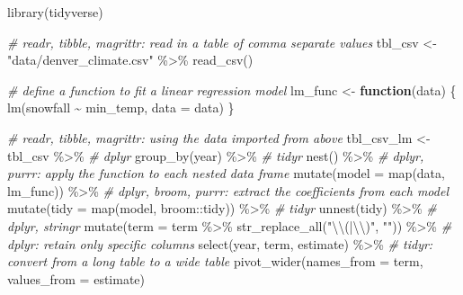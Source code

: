 \documentclass[
]{book}
\newenvironment{Shaded}{\begin{snugshade}}{\end{snugshade}}
\newcommand{\AttributeTok}[1]{\textcolor[rgb]{0.77,0.63,0.00}{#1}}
\newcommand{\CommentTok}[1]{\textcolor[rgb]{0.56,0.35,0.01}{\textit{#1}}}
\newcommand{\ControlFlowTok}[1]{\textcolor[rgb]{0.13,0.29,0.53}{\textbf{#1}}}
\newcommand{\FunctionTok}[1]{\textcolor[rgb]{0.00,0.00,0.00}{#1}}
\newcommand{\NormalTok}[1]{#1}
\newcommand{\OtherTok}[1]{\textcolor[rgb]{0.56,0.35,0.01}{#1}}
\newcommand{\SpecialCharTok}[1]{\textcolor[rgb]{0.00,0.00,0.00}{#1}}
\newcommand{\StringTok}[1]{\textcolor[rgb]{0.31,0.60,0.02}{#1}}
\begin{document}
\begin{Shaded}
\begin{Highlighting}[]
\FunctionTok{library}\NormalTok{(tidyverse)}

\CommentTok{\# readr, tibble, magrittr: read in a table of comma separate values}
\NormalTok{tbl\_csv }\OtherTok{\textless{}{-}} \StringTok{"data/denver\_climate.csv"} \SpecialCharTok{\%\textgreater{}\%} \FunctionTok{read\_csv}\NormalTok{()}

\CommentTok{\# define a function to fit a linear regression model}
\NormalTok{lm\_func }\OtherTok{\textless{}{-}} \ControlFlowTok{function}\NormalTok{(data) \{}
  \FunctionTok{lm}\NormalTok{(snowfall }\SpecialCharTok{\textasciitilde{}}\NormalTok{ min\_temp, }\AttributeTok{data =}\NormalTok{ data)}
\NormalTok{\}}

\CommentTok{\# readr, tibble, magrittr: using the data imported from above}
\NormalTok{tbl\_csv\_lm }\OtherTok{\textless{}{-}}\NormalTok{ tbl\_csv }\SpecialCharTok{\%\textgreater{}\%}
  \CommentTok{\# dplyr}
  \FunctionTok{group\_by}\NormalTok{(year) }\SpecialCharTok{\%\textgreater{}\%}
  \CommentTok{\# tidyr}
  \FunctionTok{nest}\NormalTok{() }\SpecialCharTok{\%\textgreater{}\%}
  \CommentTok{\# dplyr, purrr: apply the function to each nested data frame}
  \FunctionTok{mutate}\NormalTok{(}\AttributeTok{model =} \FunctionTok{map}\NormalTok{(data, lm\_func)) }\SpecialCharTok{\%\textgreater{}\%}
  \CommentTok{\# dplyr, broom, purrr: extract the coefficients from each model}
  \FunctionTok{mutate}\NormalTok{(}\AttributeTok{tidy =} \FunctionTok{map}\NormalTok{(model, broom}\SpecialCharTok{::}\NormalTok{tidy)) }\SpecialCharTok{\%\textgreater{}\%}
  \CommentTok{\# tidyr}
  \FunctionTok{unnest}\NormalTok{(tidy) }\SpecialCharTok{\%\textgreater{}\%}
  \CommentTok{\# dplyr, stringr}
  \FunctionTok{mutate}\NormalTok{(}\AttributeTok{term =}\NormalTok{ term }\SpecialCharTok{\%\textgreater{}\%} \FunctionTok{str\_replace\_all}\NormalTok{(}\StringTok{"}\SpecialCharTok{\textbackslash{}\textbackslash{}}\StringTok{(|}\SpecialCharTok{\textbackslash{}\textbackslash{}}\StringTok{)"}\NormalTok{, }\StringTok{""}\NormalTok{)) }\SpecialCharTok{\%\textgreater{}\%}
  \CommentTok{\# dplyr: retain only specific columns}
  \FunctionTok{select}\NormalTok{(year, term, estimate) }\SpecialCharTok{\%\textgreater{}\%}
  \CommentTok{\# tidyr: convert from a long table to a wide table}
  \FunctionTok{pivot\_wider}\NormalTok{(}\AttributeTok{names\_from =} \StringTok{\textquotesingle{}term\textquotesingle{}}\NormalTok{, }\AttributeTok{values\_from =} \StringTok{\textquotesingle{}estimate\textquotesingle{}}\NormalTok{)}



\end{Highlighting}
\end{Shaded}
\end{document}
